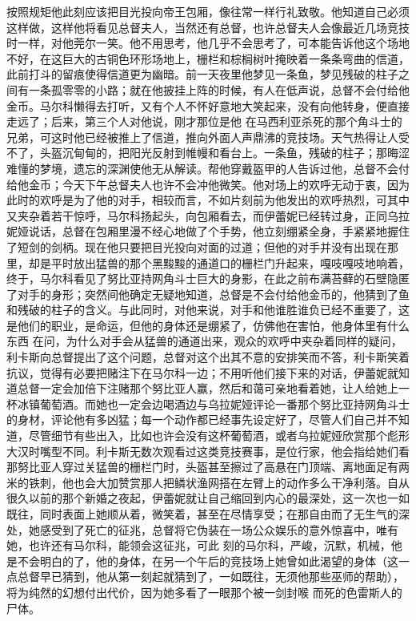 \documentclass{article}
\begin{document}
按照规矩他此刻应该把目光投向帝王包厢，像往常一样行礼致敬。他知道自己必须这样做，这样他将看见总督夫人，当然还有总督，也许总督夫人会像最近几场竞技时一样，对他莞尔一笑。他不用思考，他几乎不会思考了，可本能告诉他这个场地不好，在这巨大的古铜色环形场地上，栅栏和棕榈树叶掩映着一条条弯曲的信道，此前打斗的留痕使得信道更为幽暗。前一天夜里他梦见一条鱼，梦见残破的柱子之间有一条孤零零的小路；就在他披挂上阵的时候，有人在低声说，总督不会付给他金币。马尔科懒得去打听，又有个人不怀好意地大笑起来，没有向他转身，便直接走远了；后来，第三个人对他说，刚才那位是他
\newpage
在马西利亚杀死的那个角斗士的兄弟，可这时他已经被推上了信道，推向外面人声鼎沸的竞技场。天气热得让人受不了，头盔沉甸甸的，把阳光反射到帷幔和看台上。一条鱼，残破的柱子；那晦涩难懂的梦境，遗忘的深渊使他无从解读。帮他穿戴盔甲的人告诉过他，总督不会付给他金币；今天下午总督夫人也许不会冲他微笑。他对场上的欢呼无动于衷，因为此时的欢呼是为了他的对手，相较而言，不如片刻前为他发出的欢呼热烈，可其中又夹杂着若干惊呼，马尔科扬起头，向包厢看去，而伊蕾妮已经转过身，正同乌拉妮娅说话，总督在包厢里漫不经心地做了个手势，他立刻绷紧全身，手紧紧地握住了短剑的剑柄。现在他只要把目光投向对面的过道；但他的对手并没有出现在那里，却是平时放出猛兽的那个黑黢黢的通道口的栅栏门升起来，嘎吱嘎吱地响着，终于，马尔科看见了努比亚持网角斗士巨大的身影，在此之前布满苔藓的石壁隐匿了对手的身形；突然间他确定无疑地知道，总督是不会付给他金币的，他猜到了鱼和残破的柱子的含义。与此同时，对他来说，对手和他谁胜谁负已经不重要了，这是他们的职业，是命运，但他的身体还是绷紧了，仿佛他在害怕，他身体里有什么东西
\newpage
在问，为什么对手会从猛兽的通道出来，观众的欢呼中夹杂着同样的疑问，利卡斯向总督提出了这个问题，总督对这个出其不意的安排笑而不答，利卡斯笑着抗议，觉得有必要把赌注下在马尔科一边；不用听他们接下来的对话，伊蕾妮就知道总督一定会加倍下注赌那个努比亚人赢，然后和蔼可亲地看着她，让人给她上一杯冰镇葡萄酒。而她也一定会边喝酒边与乌拉妮娅评论一番那个努比亚持网角斗士的身材，评论他有多凶猛；每一个动作都已经事先设定好了，尽管人们自己并不知道，尽管细节有些出入，比如也许会没有这杯葡萄酒，或者乌拉妮娅欣赏那个彪形大汉时嘴型不同。利卡斯无数次观看过这类竞技赛事，是位行家，他会指给她们看那努比亚人穿过关猛兽的栅栏门时，头盔甚至擦过了高悬在门顶端、离地面足有两米的铁刺，他也会大加赞赏那人把鳞状渔网搭在左臂上的动作多么干净利落。自从很久以前的那个新婚之夜起，伊蕾妮就让自己缩回到内心的最深处，这一次也一如既往，同时表面上她顺从着，微笑着，甚至在尽情享受；在那自由而了无生气的深处，她感受到了死亡的征兆，总督将它伪装在一场公众娱乐的意外惊喜中，唯有她，也许还有马尔科，能领会这征兆，可此
\newpage
刻的马尔科，严峻，沉默，机械，他是不会明白的了，他的身体，在另一个午后的竞技场上她曾如此渴望的身体（这一点总督早已猜到，他从第一刻起就猜到了，一如既往，无须他那些巫师的帮助），将为纯然的幻想付出代价，因为她多看了一眼那个被一剑封喉
而死的色雷斯人的尸体。 
\end{document}

